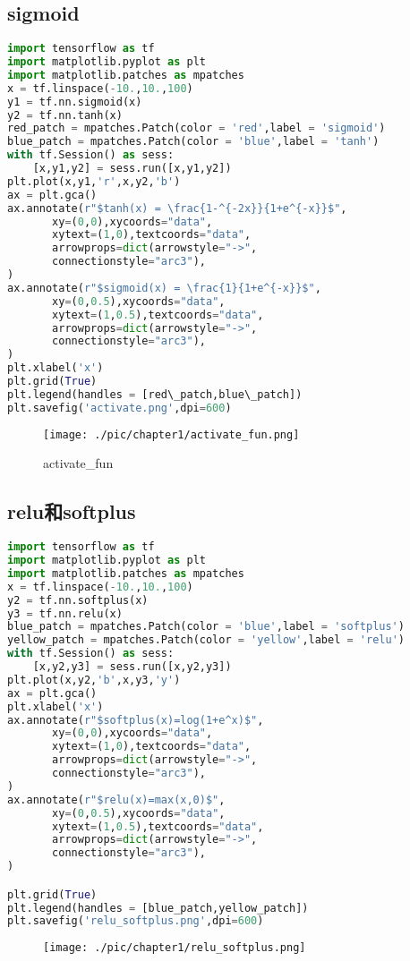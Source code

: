 \subsection{sigmoid}
\begin{lstlisting}[language=Python]
import tensorflow as tf 
import matplotlib.pyplot as plt 
import matplotlib.patches as mpatches
x = tf.linspace(-10.,10.,100)
y1 = tf.nn.sigmoid(x)
y2 = tf.nn.tanh(x)
red_patch = mpatches.Patch(color = 'red',label = 'sigmoid')
blue_patch = mpatches.Patch(color = 'blue',label = 'tanh')
with tf.Session() as sess:
	[x,y1,y2] = sess.run([x,y1,y2])
plt.plot(x,y1,'r',x,y2,'b')
ax = plt.gca()
ax.annotate(r"$tanh(x) = \frac{1-^{-2x}}{1+e^{-x}}$",
	   xy=(0,0),xycoords="data",
	   xytext=(1,0),textcoords="data",
	   arrowprops=dict(arrowstyle="->",
	   connectionstyle="arc3"),
)
ax.annotate(r"$sigmoid(x) = \frac{1}{1+e^{-x}}$",
	   xy=(0,0.5),xycoords="data",
	   xytext=(1,0.5),textcoords="data",
	   arrowprops=dict(arrowstyle="->",
	   connectionstyle="arc3"),
)
plt.xlabel('x')
plt.grid(True)
plt.legend(handles = [red\_patch,blue\_patch])
plt.savefig('activate.png',dpi=600)
\end{lstlisting}
\begin{figure}[H]
\centering
\texttt{[image: ./pic/chapter1/activate\_fun.png]}
\caption{activate\_fun}
\end{figure}
\subsection{relu和softplus}
\begin{lstlisting}[language=Python]
import tensorflow as tf 
import matplotlib.pyplot as plt 
import matplotlib.patches as mpatches
x = tf.linspace(-10.,10.,100)
y2 = tf.nn.softplus(x)
y3 = tf.nn.relu(x)
blue_patch = mpatches.Patch(color = 'blue',label = 'softplus')
yellow_patch = mpatches.Patch(color = 'yellow',label = 'relu')
with tf.Session() as sess:
	[x,y2,y3] = sess.run([x,y2,y3])
plt.plot(x,y2,'b',x,y3,'y')
ax = plt.gca()
plt.xlabel('x')
ax.annotate(r"$softplus(x)=log(1+e^x)$",
	   xy=(0,0),xycoords="data",
	   xytext=(1,0),textcoords="data",
	   arrowprops=dict(arrowstyle="->",
	   connectionstyle="arc3"),
)
ax.annotate(r"$relu(x)=max(x,0)$",
	   xy=(0,0.5),xycoords="data",
	   xytext=(1,0.5),textcoords="data",
	   arrowprops=dict(arrowstyle="->",
	   connectionstyle="arc3"),
)

plt.grid(True)
plt.legend(handles = [blue_patch,yellow_patch])
plt.savefig('relu_softplus.png',dpi=600)
\end{lstlisting}
\begin{figure}[H]
\centering
\texttt{[image: ./pic/chapter1/relu\_softplus.png]}
\end{figure}
